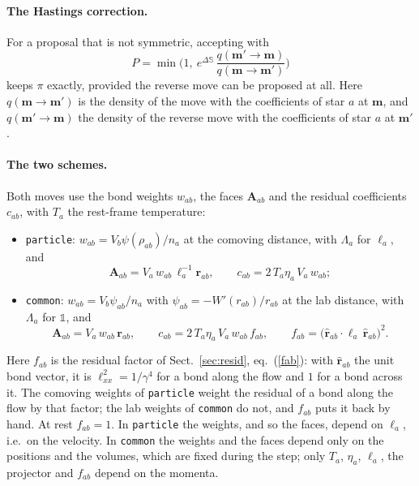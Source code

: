\documentclass[11pt,aps,preprint,nofootinbib,superscriptaddress,tightenlines]{revtex4-2}
\newcommand{\one}{\mathds{1}}
\def\st{\begin{equation}}
\def\stp{\end{equation}}
\def\Eq#1{eq.~(\ref{#1})}
\def\Sect#1{Sect.~\ref{#1}}
\let\oldparagraph\paragraph
\renewcommand{\paragraph}{\par\bigskip\oldparagraph}
\begin{document}
\paragraph{The Hastings correction.}  For a proposal that is not symmetric, accepting with
\st
P=\min\Big(1,\ e^{\Delta\mathbb S}\,\frac{q(\bm m'\to\bm m)}{q(\bm m\to\bm m')}\Big)
\label{hastings}
\stp
keeps $\pi$ exactly, provided the reverse move can be proposed at all.  Here $q(\bm m\to\bm m')$ is the density of the move with the
coefficients of star $a$ at $\bm m$, and $q(\bm m'\to\bm m)$ the density of the reverse move with the coefficients of star $a$ at $\bm m'$.

\paragraph{The two schemes.}  Both moves use the bond weights $w_{ab}$, the faces $\bm A_{ab}$ and the residual coefficients $c_{ab}$,
with $T_a$ the rest-frame temperature:
\begin{itemize}
\item \texttt{particle}: $w_{ab}=V_b\psi(\rho_{ab})/n_a$ at the comoving distance, with $\Lambda_a$ for $\ell_a$, and
  \st
  \bm A_{ab}=V_a\,w_{ab}\,\ell_a^{-1}\bm r_{ab},\qquad c_{ab}=2\,T_a\eta_a\,V_a\,w_{ab} ;
  \stp
\item \texttt{common}: $w_{ab}=V_b\psi_{ab}/n_a$ with $\psi_{ab}=-W'(r_{ab})/r_{ab}$ at the lab distance, with $\Lambda_a$ for $\one$, and
  \st
  \bm A_{ab}=V_a\,w_{ab}\,\bm r_{ab},\qquad c_{ab}=2\,T_a\eta_a\,V_a\,w_{ab}\,f_{ab},\qquad f_{ab}=\big(\hat{\bm r}_{ab}\cdot\ell_a\,\hat{\bm r}_{ab}\big)^2 .
  \stp
\end{itemize}
Here $f_{ab}$ is the residual factor of \Sect{sec:resid}, \Eq{fab}: with $\hat{\bm r}_{ab}$ the unit bond vector, it is $\ell_{xx}^2=1/\gamma^4$ for
a bond along the flow and $1$ for a bond across it.  The comoving weights of \texttt{particle} weight the residual of a bond
along the flow by that factor; the lab weights of \texttt{common} do not, and $f_{ab}$ puts it back by hand.  At rest $f_{ab}=1$.
In \texttt{particle} the weights, and so the faces, depend on $\ell_a$, i.e.\ on the velocity.  In \texttt{common} the weights and the
faces depend only on the positions and the volumes, which are fixed during the step; only $T_a$, $\eta_a$, $\ell_a$, the projector and
$f_{ab}$ depend on the momenta.
\end{document}
